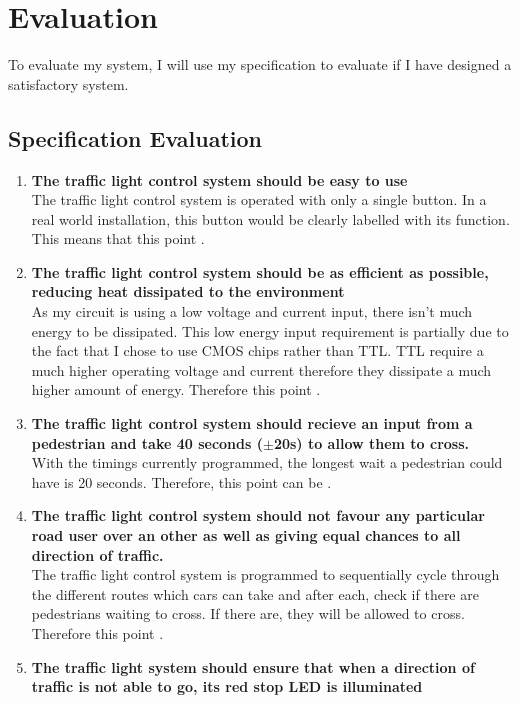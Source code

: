 \chapter{Evaluation}
\label{chap:evaluation}

To evaluate my system, I will use my specification to evaluate if I have designed a satisfactory system.
\section{Specification Evaluation}
\begin{enumerate}
    \item \textbf{The traffic light control system should be easy to use}\\
    The traffic light control system is operated with only a single button. In a real world installation, this button would be clearly labelled with its function. This means that this point .
    \item \textbf{The traffic light control system should be as efficient as possible, reducing heat dissipated to the environment}  \\
    As my circuit is using a low voltage and current input, there isn't much energy to be dissipated. This low energy input requirement is partially due to the fact that I chose to use CMOS chips rather than TTL. TTL require a much higher operating voltage and current therefore they dissipate a much higher amount of energy. Therefore this point .
    \item \textbf{The traffic light control system should recieve an input from a pedestrian and take 40 seconds ($\pm$20s) to allow them to cross.}\\
    With the timings currently programmed, the longest wait a pedestrian could have is 20 seconds. Therefore, this point can be .
    \item \textbf{The traffic light control system should not favour any particular road user over an other as well as giving equal chances to all direction of traffic.}\\
    The traffic light control system is programmed to sequentially cycle through the different routes which cars can take and after each, check if there are pedestrians waiting to cross. If there are, they will be allowed to cross. Therefore this point .
    \item \textbf{The traffic light system should ensure that when a direction of traffic is not able to go, its red stop LED is illuminated}\\

\end{enumerate}
